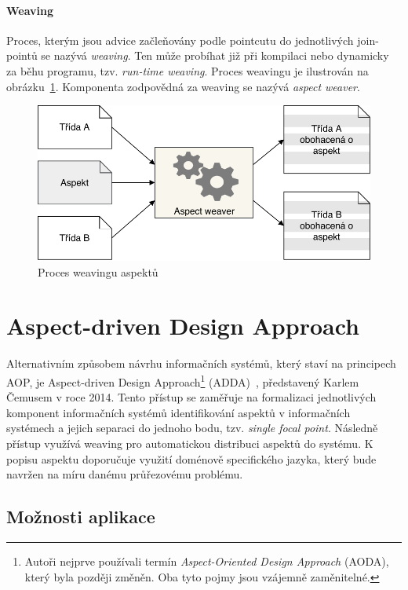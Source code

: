 \paragraph{Weaving}
Proces, kterým jsou advice začleňovány podle pointcutu do
jednotlivých join-pointů se nazývá \textit{weaving}. Ten může
probíhat již při kompilaci nebo dynamicky za běhu programu,
tzv. \textit{run-time weaving}. Proces weavingu je ilustrován
na obrázku~\ref{fig:aspect-weaving}. Komponenta zodpovědná za
weaving se nazývá \textit{aspect weaver}.

\begin{figure}[t]
    \centering
    \includegraphics[keepaspectratio=true, width=0.7\linewidth]{figures/aspect-weaving.pdf}
    \caption{Proces weavingu aspektů}
    \label{fig:aspect-weaving}
\end{figure}

\section{Aspect-driven Design Approach}

Alternativním způsobem návrhu informačních systémů, který staví na principech \gls{AOP},
je Aspect-driven Design Approach\footnote{Autoři nejprve používali termín \textit{Aspect-Oriented
Design Approach} (AODA), který byla později změněn. Oba tyto pojmy jsou vzájemně zaměnitelné.}
(\gls{ADDA})~\cite{cemus2014aspect}, představený Karlem Čemusem v roce 2014.
Tento přístup se zaměřuje na formalizaci jednotlivých komponent informačních systémů identifikování aspektů
v informačních systémech a jejich separaci do jednoho bodu, tzv. \textit{single focal point}.
Následně přístup využívá weaving pro automatickou distribuci aspektů do systému.
K popisu aspektu doporučuje využití doménově specifického jazyka, který bude navržen na
míru danému průřezovému problému.

\subsection{Možnosti aplikace}

